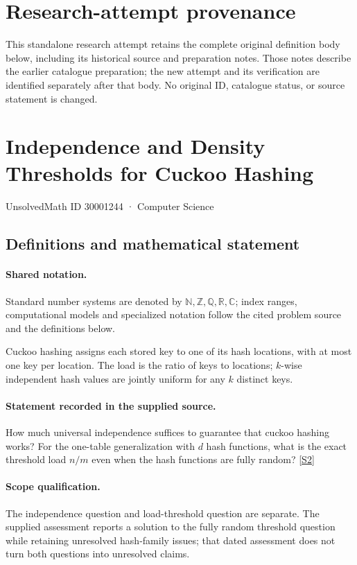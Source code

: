 \documentclass[11pt]{article}
\begin{document}
\section*{Research-attempt provenance}
This standalone research attempt retains the complete original definition body below,
including its historical source and preparation notes. Those notes describe the
earlier catalogue preparation; the new attempt and its verification are identified
separately after that body. No original ID, catalogue status, or source statement is changed.

\section{Independence and Density Thresholds for Cuckoo Hashing}\label{30001244}
{\small UnsolvedMath ID 30001244 · Computer Science}
\subsection{Definitions and mathematical statement}

\paragraph{Shared notation.}Standard number systems are denoted by $\mathbb N,\mathbb Z,\mathbb Q,\mathbb R,\mathbb C$; index ranges, computational models and specialized notation follow the cited problem source and the definitions below.


Cuckoo hashing assigns each stored key to one of its hash locations, with at most one key per location. The load is the ratio of keys to locations; $k$-wise independent hash values are jointly uniform for any $k$ distinct keys.
\paragraph{Statement recorded in the supplied source.}
How much universal independence suffices to guarantee that cuckoo hashing works? For the one-table generalization with $d$ hash functions, what is the exact threshold load $n/m$ even when the hash functions are fully random? \href{https://doi.org/10.4171/owr/2009/23}{[S2]}
\paragraph{Scope qualification.}
The independence question and load-threshold question are separate. The supplied assessment reports a solution to the fully random threshold question while retaining unresolved hash-family issues; that dated assessment does not turn both questions into unresolved claims.
\end{document}
